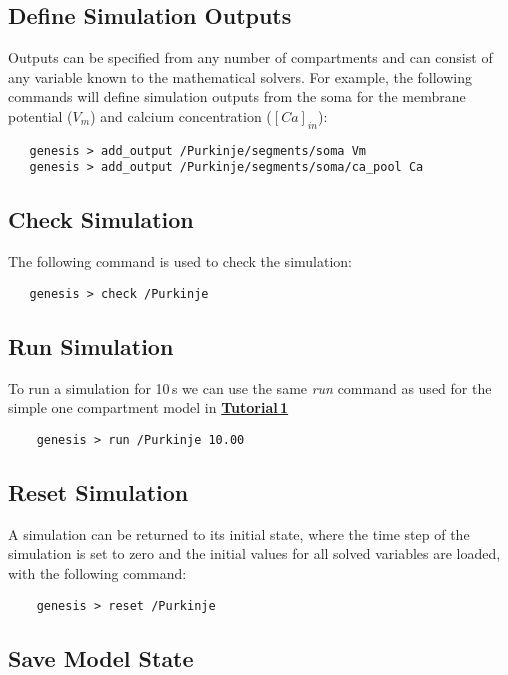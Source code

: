 \documentclass[12pt]{article}
\begin{document}
\subsection*{Define Simulation Outputs}

Outputs can be specified from any number of compartments and can consist of any variable known to the mathematical solvers. For example, the following commands will define simulation outputs from the soma for the membrane potential ($V_m$) and calcium concentration ($[Ca]_{in}$):
\begin{verbatim}
   genesis > add_output /Purkinje/segments/soma Vm
   genesis > add_output /Purkinje/segments/soma/ca_pool Ca
\end{verbatim}

\subsection*{Check Simulation}

The following command is used to check the simulation:
\begin{verbatim}
   genesis > check /Purkinje
\end{verbatim}

\subsection*{Run Simulation}

To run a simulation for 10\,s we can use the same {\it run} command as used for the simple one compartment model in \href{../tutorial1/tutorial1.tex}{\bf Tutorial\,1}
\begin{verbatim}
    genesis > run /Purkinje 10.00
\end{verbatim}

\subsection*{Reset Simulation}

A simulation can be returned to its initial state, where the time step of the simulation is set to zero and the initial values for all solved variables are loaded, with the following command:
\begin{verbatim}
    genesis > reset /Purkinje
\end{verbatim}

\subsection*{Save Model State}
\end{document}
